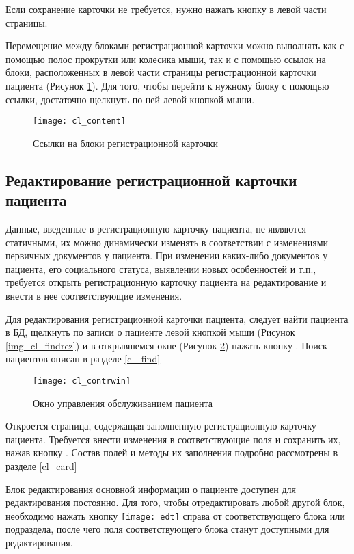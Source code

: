 Если сохранение карточки не требуется, нужно нажать кнопку  в левой части страницы.

Перемещение между блоками регистрационной карточки можно выполнять как с помощью полос прокрутки или колесика мыши, так и с помощью ссылок на блоки, расположенных в левой части страницы регистрационной карточки пациента (Рисунок \ref{img_cl_content}). Для того, чтобы перейти к нужному блоку с помощью ссылки, достаточно щелкнуть по ней левой кнопкой мыши.

\begin{figure}[ht]\centering
 \texttt{[image: cl\_content]}
 \caption{Ссылки на блоки регистрационной карточки}
 \label{img_cl_content}
\end{figure} 

\subsection{Редактирование регистрационной карточки пациента}

Данные, введенные в регистрационную карточку пациента, не являются статичными, их можно динамически изменять в соответствии с изменениями первичных документов у пациента. При изменении каких-либо документов у пациента, его социального статуса, выявлении новых особенностей и т.п., требуется открыть регистрационную карточку пациента на редактирование и внести в нее соответствующие изменения. 

Для редактирования регистрационной карточки пациента, следует найти пациента в БД, щелкнуть по записи о пациенте левой кнопкой мыши (Рисунок \ref{img_cl_findrez}) и в открывшемся окне (Рисунок \ref{img_cl_contrwin}) нажать кнопку . Поиск пациентов описан в разделе \ref{cl_find}

\begin{figure}[ht]\centering
 \texttt{[image: cl\_contrwin]}
 \caption{Окно управления обслуживанием пациента}
 \label{img_cl_contrwin}
\end{figure} 

Откроется страница, содержащая заполненную регистрационную карточку пациента. Требуется внести изменения в соответствующие поля и сохранить их, нажав кнопку . Состав полей и методы их заполнения подробно рассмотрены в разделе \ref{cl_card}

Блок редактирования основной информации о пациенте доступен для редактирования постоянно. Для того, чтобы отредактировать любой другой блок, необходимо нажать кнопку \texttt{[image: edt]} справа от соответствующего блока или подраздела, после чего поля соответствующего блока станут доступными для редактирования.

